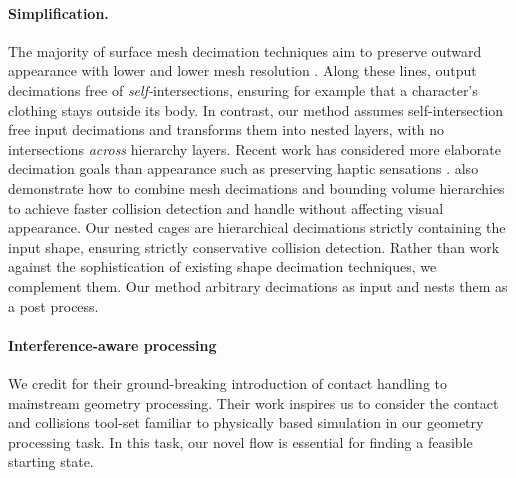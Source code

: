 
\paragraph{Simplification.}
%
The majority of surface mesh decimation techniques aim to preserve outward
appearance with lower and lower mesh resolution
\cite{Hoppe:1996:PM,Garland:1997:SSU,Melax98}.
%
Along these lines, \cite{gumhold2003intersection} output
decimations free of \emph{self-}intersections, ensuring for example that a
character's clothing stays outside its body.
%
In contrast, our method assumes self-intersection free input decimations and
transforms them into nested layers, with no intersections \emph{across}
hierarchy layers.
%
Recent work has considered more elaborate decimation goals than appearance such
as preserving haptic sensations \cite{Otaduy:2003:SPS}.
%
\cite{Otaduy:2003:CDH} also demonstrate how to combine mesh decimations and bounding
volume hierarchies to achieve faster collision detection and handle without
affecting visual appearance.
%
Our nested cages are hierarchical decimations strictly containing the input
shape, ensuring strictly conservative collision detection.
%
Rather than work against the sophistication of existing shape decimation
techniques, we complement them. Our method arbitrary decimations as input and
nests them as a post process.

\paragraph{Interference-aware processing} We credit
\cite{ContactAwareModeling:2011} for their ground-breaking introduction of
contact handling to mainstream geometry processing. Their work inspires us to
consider the contact and collisions tool-set familiar to physically based
simulation in our geometry processing task.
%
In this task, our novel flow is essential for finding a feasible starting
state.
